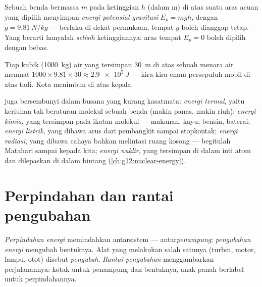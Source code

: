 \begin{definition}\label{def:g10:energy-conservation:potential}
Sebuah benda bermassa $m$ pada ketinggian $h$ (dalam \unit{m}) di atas
suatu aras acuan yang dipilih menyimpan \emph{energi potensial
gravitasi} $E_p = m g h$, dengan
$g = \qty{9.81}{N/kg}$ --- berlaku di dekat permukaan, tempat $g$ boleh
dianggap tetap. Yang berarti hanyalah \emph{selisih} ketinggiannya:
aras tempat $E_p = 0$ boleh dipilih dengan bebas.
\end{definition}

\begin{example}\label{ex:g10:energy-conservation:potential}
Tiap  kubik (\qty{1000}{kg}) air yang tersimpan \qty{30}{m} di
atas sebuah menara air memuat
$1000 \times 9.81 \times 30 \approx \qty{2.9e5}{J}$ --- kira-kira enam
persepuluh  mobil di atas tadi. Kota menimbun  di
atas kepala.
\end{example}

\begin{definition}\label{def:g10:energy-conservation:forms}
 juga bersembunyi dalam busana yang kurang kasatmata:
\emph{energi termal}, yaitu keriuhan tak beraturan
molekul sebuah benda (makin panas, makin riuh); \emph{energi
kimia}, yang tersimpan pada ikatan molekul ---
makanan, kayu, bensin, baterai; \emph{energi listrik}, yang dibawa arus dari pembangkit sampai stopkontak;
\emph{energi radiasi}, yang dibawa cahaya bahkan
melintasi ruang kosong --- begitulah  Matahari sampai kepada
kita; \emph{energi nuklir}, yang tersimpan di
dalam inti atom dan dilepaskan di dalam bintang
(\cref{ch:g12:nuclear-energy}).
\end{definition}

\section{Perpindahan dan rantai pengubahan}

\begin{definition}\label{def:g10:energy-conservation:transfer}
\emph{Perpindahan energi} memindahkan 
antarsistem --- antar\emph{penampung};
\emph{pengubahan energi} mengubah bentuknya.
Alat yang melakukan salah satunya (turbin, motor, lampu, otot) disebut
\emph{pengubah}. \emph{Rantai
pengubahan} menggambarkan perjalanannya: kotak
untuk penampung dan bentuknya, anak panah berlabel untuk
perpindahannya.
\end{definition}

